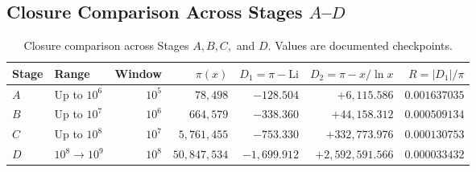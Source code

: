 \documentclass[12pt,a4paper]{article}
\begin{document}
\subsection{Closure Comparison Across Stages $A$--$D$}
\begin{table}[H]
\centering\small
\begin{tabular}{llrrrrr}
\toprule
\textbf{Stage} & \textbf{Range} & \textbf{Window} & $\pi(x)$ & $D_1 = \pi - \mathrm{Li}$ & $D_2 = \pi - x/\ln x$ & $R = |D_1|/\pi$ \\
\midrule
$A$ & Up to $10^6$ & $10^5$ & $78,498$ & $-128.504$ & $+6,115.586$ & $0.001637035$ \\
$B$ & Up to $10^7$ & $10^6$ & $664,579$ & $-338.360$ & $+44,158.312$ & $0.000509134$ \\
$C$ & Up to $10^8$ & $10^7$ & $5,761,455$ & $-753.330$ & $+332,773.976$ & $0.000130753$ \\
$D$ & $10^8 \rightarrow 10^9$ & $10^8$ & $50,847,534$ & $-1,699.912$ & $+2,592,591.566$ & $0.000033432$ \\
\bottomrule
\end{tabular}
\caption{Closure comparison across Stages $A, B, C,$ and $D$. Values are documented checkpoints.}
\end{table}
\end{document}
